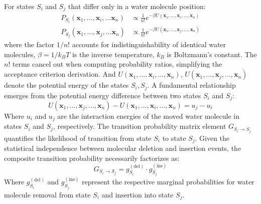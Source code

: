 \documentclass[journal=jacsat,manuscript=article]{achemso}
\begin{document}
For states $S_i$ and $S_j$ that differ only in a water molecule position:
\begin{equation}\label{eq:equilibrium_probability}
  \begin{aligned}
  P_{S_i}\left(\mathbf{x}_1, \ldots, \mathbf{x}_i, \ldots\mathbf{x}_n\right) & \propto \frac{1}{n!} e^{-\beta U\left(\mathbf{x}_1, \ldots, \mathbf{x}_i,\ldots, \mathbf{x}_n\right)}  \\
  P_{S_j}\left(\mathbf{x}_1, \ldots, \mathbf{x}_j, \ldots\mathbf{x}_n\right) & \propto \frac{1}{n!} e^{-\beta U\left(\mathbf{x}_1, \ldots, \mathbf{x}_j,\ldots, \mathbf{x}_n\right)}
  \end{aligned}
\end{equation} 
where the factor $1/n!$ accounts for indistinguishability of identical water molecules, 
$ \beta = 1/k_B T $ is the inverse temperature, $k_B$ is Boltzmann's constant. 
The $n!$ terms cancel out when computing probability ratios, simplifying the acceptance criterion derivation.
And $U\left(\mathbf{x}_1, \ldots, \mathbf{x}_i,\ldots, \mathbf{x}_n\right)$, $U\left(\mathbf{x}_1, \ldots, \mathbf{x}_j,\ldots, \mathbf{x}_n\right)$ denote the potential energy of the states $S_i, S_j$.
A fundamental relationship emerges from the potential energy difference between two states $S_i$ and $S_j$:
\begin{equation}\label{eq:potential_energy_interaction}
U\left(\mathbf{x}_1, \ldots, \mathbf{x}_j,\ldots, \mathbf{x}_n\right) - U\left(\mathbf{x}_1, \ldots, \mathbf{x}_i,\ldots, \mathbf{x}_n\right) = u_j - u_i
\end{equation}
Where $u_i$ and $u_j$ are the interaction energies of the moved water molecule in states $S_i$ and $S_j$, respectively.
\newline
The transition probability matrix element $G_{S_i \to S_j}$ quantifies the likelihood of transition from state $S_i$ to state $S_j$. 
Given the statistical independence between molecular deletion and insertion events, 
the composite transition probability necessarily factorizes as:
\begin{equation}\label{eq:transition_probability_decomposition}
G_{S_i \to S_j} = g_{S_i}^{(\text{del})} \cdot g_{S_j}^{(\text{ins})}
\end{equation}
Where $g_{S_i}^{(\text{del})}$ and $g_{S_j}^{(\text{ins})}$ represent the respective marginal probabilities for water molecule removal from state $S_i$ and insertion into state $S_j$.
\end{document}

